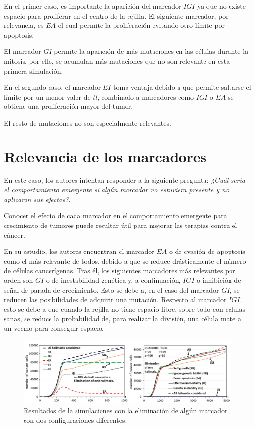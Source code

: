 En el primer caso, es importante la aparición del marcador $IGI$ ya que no existe espacio
para proliferar en el centro de la rejilla. El siguiente marcador, por relevancia, es $EA$
el cual permite la proliferación evitando otro límite por apoptosis.

El marcador $GI$ permite la aparición de más mutaciones en las células durante la mitosis, por ello,
se acumulan más mutaciones que no son relevante en esta primera simulación.

En el segundo caso, el marcador $EI$ toma ventaja debido a que permite saltarse el límite por un
menor valor de $tl$, combinado a marcadores como $IGI$ o $EA$ se obtiene una proliferación mayor del
tumor.

El resto de mutaciones no son especialmente relevantes.

\section{Relevancia de los marcadores}

En este caso, los autores intentan responder a la siguiente pregunta: \textit{¿Cuál sería
el comportamiento emergente si algún marcador no estuviera presente y no aplicaran
sus efectos?}.

Conocer el efecto de cada marcador en el comportamiento emergente para crecimiento de tumores
puede resultar útil para mejorar las terapias contra el cáncer.

En su estudio, los autores encuentran el marcador $EA$ o de evasión de apoptosis como el más
relevante de todos, debido a que se reduce drásticamente el número de células cancerígenas.
Tras él, los siguientes marcadores más relevantes por orden son $GI$ o de inestabilidad genética y,
a continuación, $IGI$ o inhibición de señal de parada de crecimiento. Esto se debe a, en el caso
del marcador $GI$, se reducen las posibilidades de adquirir una mutación. Respecto al marcador $IGI$,
esto se debe a que cuando la rejilla no tiene espacio libre, sobre todo con células sanas, se reduce
la probabilidad de, para realizar la división, una célula mate a un vecino para conseguir espacio.

\begin{figure}[h]
\centering
\includegraphics[scale=0.5]{figures/experiments/exp6}
\caption{Resultados de la simulaciones con la eliminación de algún marcador con dos configuraciones diferentes.}
\label{fig:exp6}
\end{figure}
